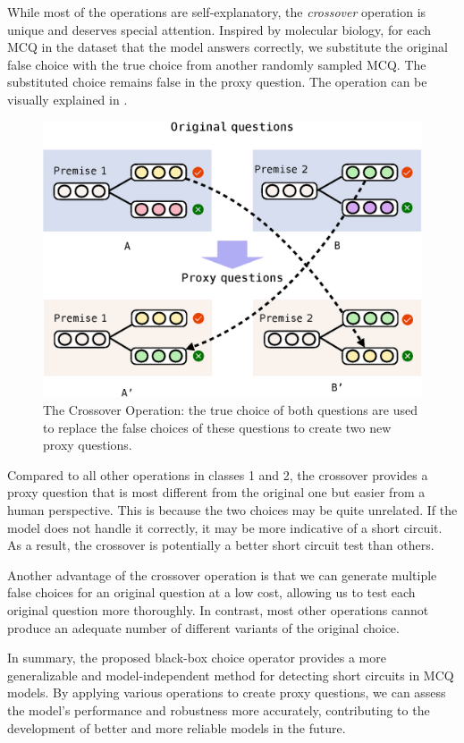 While most of the operations are self-explanatory, the \textit{crossover} operation is unique and deserves special attention. Inspired by molecular biology, for each MCQ in the dataset that the model answers correctly, we substitute the original false choice with the true choice from another randomly sampled MCQ. The substituted choice remains false in the proxy question. The operation can be visually explained in .

\begin{figure}[th]
\centering
\includegraphics[width=0.9\columnwidth]{figure/cross.eps}
\caption{The Crossover Operation: the true choice of both questions
are used to replace the false choices of these questions to create
two new proxy questions.}
\label{fig:cross}
\end{figure}

Compared to all other operations in classes 1 and 2, the crossover provides a proxy question that is most different from the original one but easier from a human perspective. This is because the two choices may be quite unrelated. If the model does not handle it correctly, it may be more indicative of a short circuit. As a result, the crossover is potentially a better short circuit test than others.

Another advantage of the crossover operation is that we can generate multiple false choices for an original question at a low cost, allowing us to test each original question more thoroughly. In contrast, most other operations cannot produce an adequate number of different variants of the original choice.

In summary, the proposed black-box choice operator provides a more generalizable and model-independent method for detecting short circuits in MCQ models. By applying various operations to create proxy questions, we can assess the model's performance and robustness more accurately, contributing to the development of better and more reliable models in the future.


